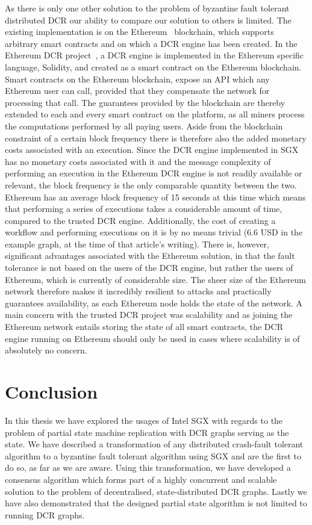 \documentclass{article}
\begin{document}
	As there is only one other solution to the problem of byzantine fault tolerant distributed DCR our ability to compare our solution to others is limited.
	The existing implementation is on the Ethereum~\cite{_ethereum_2018} blockchain, which supports arbitrary smart contracts and on which a DCR engine has been created.
	In the Ethereum DCR project~\cite{madsen_collaboration_2018}, a DCR engine is implemented in the Ethereum specific language, Solidity, and created as a smart contract on the Ethereum blockchain.
	Smart contracts on the Ethereum blockchain, expose an API which any Ethereum user can call, provided that they compensate the network for processing that call.
	The guarantees provided by the blockchain are thereby extended to each and every smart contract on the platform, as all miners process the computations performed by all paying users.
	Aside from the blockchain constraint of a certain block frequency there is therefore also the added monetary costs associated with an execution.
	Since the DCR engine implemented in SGX has no monetary costs associated with it and the message complexity of performing an execution in the Ethereum DCR engine is not readily available or relevant, the block frequency is the only comparable quantity between the two.
	Ethereum has an average block frequency of 15 seconds at this time which means that performing a series of executions takes a considerable amount of time, compared to the trusted DCR engine.
	Additionally, the cost of creating a workflow and performing executions on it is by no means trivial (6.6 USD in the example graph, at the time of that article's writing).
	There is, however, significant advantages associated with the Ethereum solution, in that the fault tolerance is not based on the users of the DCR engine, but rather the users of Ethereum, which is currently of considerable size.
	The sheer size of the Ethereum network therefore makes it incredibly resilient to attacks and practically guarantees availability, as each Ethereum node holds the state of the network.
	A main concern with the trusted DCR project was scalability and as joining the Ethereum network entails storing the state of all smart contracts, the DCR engine running on Ethereum should only be used in cases where scalability is of absolutely no concern.

	\section{Conclusion}

	In this thesis we have explored the usages of Intel SGX with regards to the problem of partial state machine replication with DCR graphs serving as the state.
	We have described a transformation of any distributed crash-fault tolerant algorithm to a byzantine fault tolerant algorithm using SGX and are the first to do so, as far as we are aware.
	Using this transformation, we have developed a consensus algorithm which forms part of a highly concurrent and scalable solution to the problem of decentralised, state-distributed DCR graphs.
	Lastly we have also demonstrated that the designed partial state algorithm is not limited to running DCR graphs.
\end{document}
